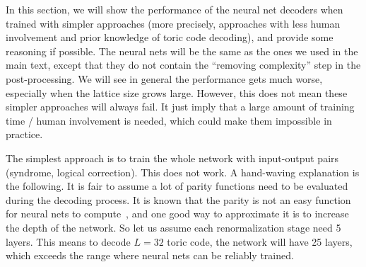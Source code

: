 In this section, we will show the performance of the neural net decoders when trained with simpler approaches (more precisely, approaches with less human involvement and prior knowledge of toric code decoding), and provide some reasoning if possible.
The neural nets will be the same as the ones we used in the main text, except that they do not contain the ``removing complexity'' step in the post-processing.
We will see in general the performance gets much worse, especially when the lattice size grows large.
However, this does not mean these simpler approaches will always fail.
It just imply that a large amount of training time / human involvement is needed, which could make them impossible in practice.

The simplest approach is to train the whole network with input-output pairs (syndrome, logical correction).
This does not work.
A hand-waving explanation is the following.
It is fair to assume a lot of parity functions need to be evaluated during the decoding process.
It is known that the parity is not an easy function for neural nets to compute~\cite{bengio2007scaling}, and one good way to approximate it is to increase the depth of the network.
So let us assume each renormalization stage need 5 layers.
This means to decode $L=32$ toric code, the network will have 25 layers, which exceeds the range where neural nets can be reliably trained.

